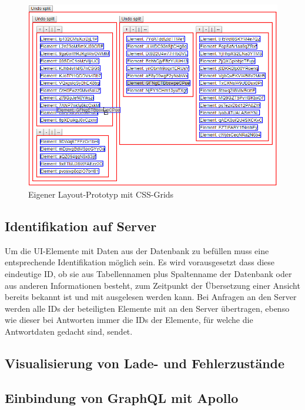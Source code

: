 \begin{figure}
    \centering
    \captionsetup{justification=centering}
    \includegraphics[width=\textwidth]{figures/layout_grid_test.png}
        \caption{Eigener Layout-Prototyp mit CSS-Grids}
        \label{fig:layout_grid_test}
\end{figure}


\subsection{Identifikation auf Server}
Um die UI-Elemente mit Daten aus der Datenbank zu befüllen muss eine entsprechende Identifikation möglich sein. Es wird vorausgesetzt dass diese eindeutige ID, ob sie aus Tabellennamen plus Spaltenname der Datenbank oder aus anderen Informationen besteht, zum Zeitpunkt der Übersetzung einer Ansicht bereits bekannt ist und mit ausgelesen werden kann. Bei Anfragen an den Server werden alle IDs der beteiligten Elemente mit an den Server übertragen, ebenso wie dieser bei Antworten immer die IDs der Elemente, für welche die Antwortdaten gedacht sind, sendet.

\subsection{Visualisierung von Lade- und Fehlerzustände}

\subsection{Einbindung von GraphQL mit Apollo}


